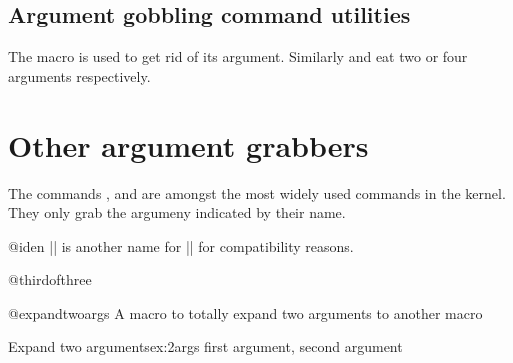 \subsection{Argument gobbling command utilities}
\label{gobble}

The  macro is used to get rid of its argument. Similarly  and  eat two or four arguments respectively.
\begin{teX}
\long{}
\long{}
\long{}
\end{teX}


\section{Other argument grabbers}

The commands ,  and  are amongst the most widely used commands in the kernel. They only grab the argumeny indicated by their name.

\begin{teX}
\long{}
\long{}
\long{}
\end{teX}

\begin{docCommand}{@iden}{}
    |\@iden| is another name for |\@firstofone| for
    compatibility reasons.
\begin{teX}
\let\@iden\@firstofone
\end{teX}
\end{docCommand}
%
\begin{docCommand}{@thirdofthree}{}

\begin{teX}
\long{}
\end{teX}
\end{docCommand}
%
%
\begin{docCommand}{@expandtwoargs}{}
 A macro to totally expand two arguments to another macro
   
\begin{teX}
\def\@expandtwoargs#1#2#3{%
   \edef\reserved@a{\noexpand#1{#2}{#3}}\reserved@a}
\end{teX}
\end{docCommand}

\begin{texexample}{Expand two arguments}{ex:2args}
\makeatletter
\bgroup
  \def\test#1#2{#1, #2} 
  \def\xx{first argument}
  \def\yy{second argument}
  \@expandtwoargs\test{\xx}{\yy}
\egroup
\makeatother
\end{texexample}

